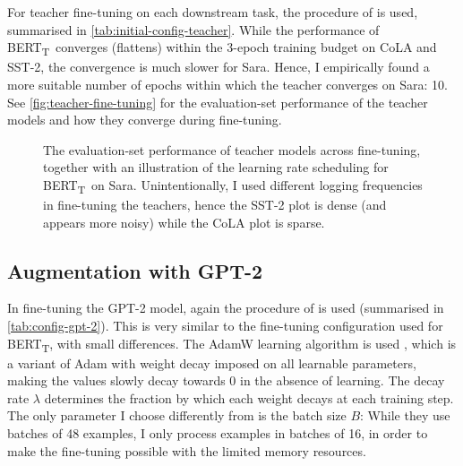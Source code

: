 \documentclass[bsc,frontabs,singlespacing,parskip,deptreport]{infthesis}
\def\BERTT{BERT\textsubscript{T}}
\begin{document}
{{{      For teacher fine-tuning on each downstream task, the procedure of \citeauthor{Tang_2019b} is used, summarised in \autoref{tab:initial-config-teacher}.
      While the performance of \BERTT~converges (flattens) within the 3-epoch training budget on CoLA and SST-2, the convergence is much slower for Sara. Hence, I empirically found a more suitable number of epochs within which the teacher converges on Sara: 10. See \autoref{fig:teacher-fine-tuning} for the evaluation-set performance of the teacher models and how they converge during fine-tuning.
      \begin{figure}[h!t]
        \centering
        \caption{The evaluation-set performance of teacher models across fine-tuning, together with an illustration of the learning rate scheduling for \BERTT~on Sara. Unintentionally, I used different logging frequencies in fine-tuning the teachers, hence the SST-2 plot is dense (and appears more noisy) while the CoLA plot is sparse.}
        \label{fig:teacher-fine-tuning}
      \end{figure}
    }

    \subsection{Augmentation with GPT-2}{
      In fine-tuning the GPT-2 model, again the procedure of \citeauthor{Tang_2019b} is used (summarised in \autoref{tab:config-gpt-2}). This is very similar to the fine-tuning configuration used for \BERTT, with small differences. The AdamW learning algorithm is used \citep{Loshchilov_2019}, which is a variant of Adam with weight decay imposed on all learnable parameters, making the values slowly decay towards 0 in the absence of learning. The decay rate $\lambda$ determines the fraction by which each weight decays at each training step.
      The only parameter I choose differently from \citeauthor{Tang_2019b} is the batch size $B$: While they use batches of 48 examples, I only process examples in batches of 16, in order to make the fine-tuning possible with the limited memory resources.

}}}
\end{document}
